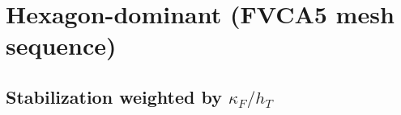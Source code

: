 \documentclass[10pt]{article}
\begin{document}
  \begin{figure}[ht]
    \centering
      \scalebox{0.7}{}%
      \scalebox{0.7}{}
      \scalebox{0.7}{}%
      \scalebox{0.7}{}
      \scalebox{0.7}{}%
      \scalebox{0.7}{}
  \end{figure}

  \begin{figure}[ht]
    \centering
      \scalebox{0.7}{}%
      \scalebox{0.7}{}
      \scalebox{0.7}{}%
      \scalebox{0.7}{}
      \scalebox{0.7}{}%
      \scalebox{0.7}{}
  \end{figure}
\FloatBarrier
\section{Hexagon-dominant (FVCA5 mesh sequence)}
\subsection{Stabilization weighted by $\kappa_F/h_T$}
\begin{figure}[ht]
    \centering
      \scalebox{0.7}{}%
      \scalebox{0.7}{}
      \scalebox{0.7}{}%
      \scalebox{0.7}{}
  \end{figure}
\end{document}
